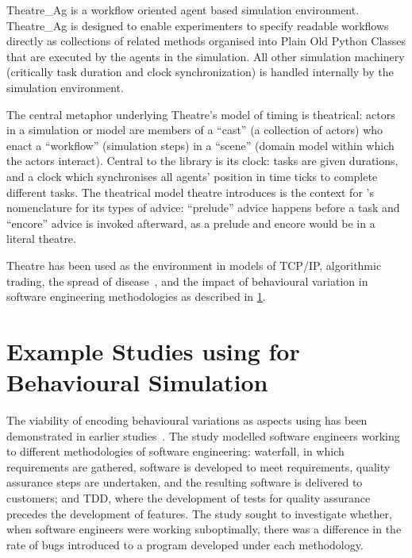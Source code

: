\begin{blockquote}
Theatre\_Ag is a workflow oriented agent based simulation environment.
Theatre\_Ag is designed to enable experimenters to specify readable workflows
directly as collections of related methods organised into Plain Old Python
Classes that are executed by the agents in the simulation. All other simulation
machinery (critically task duration and clock synchronization) is handled
internally by the simulation environment.
\end{blockquote}

The central metaphor underlying Theatre's model of timing is theatrical: actors
in a simulation or model are members of a ``cast'' (a collection of actors) who
enact a ``workflow'' (simulation steps) in a ``scene'' (domain model within
which the actors interact). Central to the library is its clock: tasks are given
durations, and a clock which synchronises all agents' position in time ticks to
complete different tasks. The theatrical model theatre introduces is the context
for \pdsf{}'s nomenclature for its types of advice: ``prelude'' advice happens
before a task and ``encore'' advice is invoked afterward, as a prelude and
encore would be in a literal theatre.

Theatre has been used as the environment in models of TCP/IP, algorithmic
trading, the spread of disease~\cite{aranTheatreThesis}, and the impact of
behavioural variation in software engineering methodologies as described in
\cref{sec:caise_paper}.


\section{Example Studies using \pdsf for Behavioural Simulation}\label{sec:caise_paper}

The viability of encoding behavioural variations as aspects using \pdsf has been
demonstrated in earlier studies~\cite{wallis2018caise,aranTheatreThesis}.
 The study modelled software engineers working to
different methodologies of software engineering: waterfall, in which
requirements are gathered, software is developed to meet requirements, quality
assurance steps are undertaken, and the resulting software is delivered to
customers; and TDD, where the development of tests for quality assurance
precedes the development of features. The study sought to investigate whether,
when software engineers were working suboptimally, there was a difference in the
rate of bugs introduced to a program developed under each methodology.

